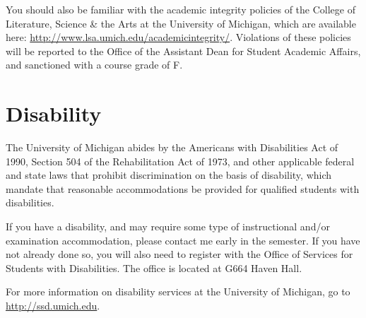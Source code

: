 \documentclass[
]{article}
\begin{document}
You should also be familiar with the academic integrity policies of the
College of Literature, Science \& the Arts at the University of
Michigan, which are available here:
\url{http://www.lsa.umich.edu/academicintegrity/}. Violations of these
policies will be reported to the Office of the Assistant Dean for
Student Academic Affairs, and sanctioned with a course grade of F.

\hypertarget{disability}{%
\section{Disability}\label{disability}}

The University of Michigan abides by the Americans with Disabilities Act
of 1990, Section 504 of the Rehabilitation Act of 1973, and other
applicable federal and state laws that prohibit discrimination on the
basis of disability, which mandate that reasonable accommodations be
provided for qualified students with disabilities.

If you have a disability, and may require some type of instructional
and/or examination accommodation, please contact me early in the
semester. If you have not already done so, you will also need to
register with the Office of Services for Students with Disabilities. The
office is located at G664 Haven Hall.

For more information on disability services at the University of
Michigan, go to \url{http://ssd.umich.edu}.
\end{document}
